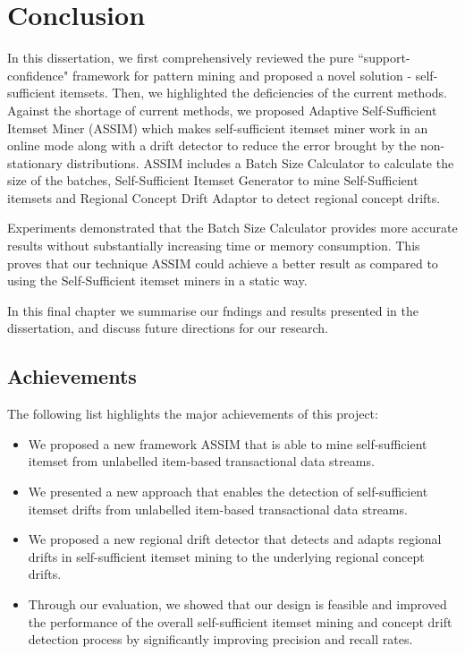 \chapter{Conclusion} \label{chapt:Conclusion}

In this dissertation, we first comprehensively reviewed the pure ``support-confidence" framework for pattern mining and proposed a novel solution - self-sufficient itemsets. Then, we highlighted the deficiencies of the current methods. Against the shortage of current methods, we proposed Adaptive Self-Sufficient Itemset Miner (ASSIM) which makes self-sufficient itemset miner work in an online mode along with a drift detector to reduce the error brought by the non-stationary distributions. ASSIM includes a Batch Size Calculator to calculate the size of the batches, Self-Sufficient Itemset Generator to mine Self-Sufficient itemsets and Regional Concept Drift Adaptor to detect regional concept drifts.

Experiments demonstrated that the Batch Size Calculator provides more accurate results without substantially increasing time or memory consumption. This proves that our technique ASSIM could achieve a better result as compared to using the Self-Sufficient itemset miners in a static way.

In this final chapter we summarise our fndings and results presented in the dissertation, and discuss future directions for our research.

\section{Achievements} \label{Conclusion:Achievements}

The following list highlights the major achievements of this project:
\begin{itemize}
	\item We proposed a new framework ASSIM that is able to mine self-sufficient itemset from unlabelled item-based transactional data streams.
		
	\item We presented a new approach that enables the detection of self-sufficient itemset drifts from unlabelled item-based transactional data streams.
	
	\item We proposed a new regional drift detector that detects and adapts regional drifts in self-sufficient itemset mining to the underlying regional concept drifts.
	
	\item Through our evaluation, we showed that our design is feasible and improved the performance of the overall self-sufficient itemset mining and concept drift detection process by significantly improving precision and recall rates.
	
\end{itemize}

